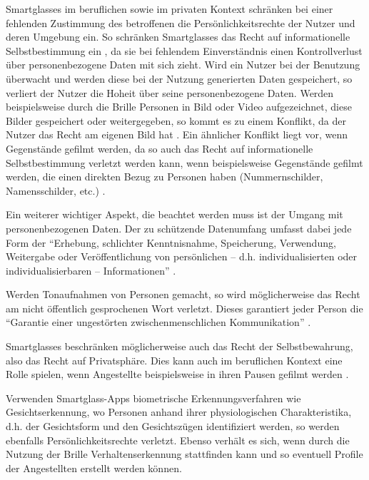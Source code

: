 Smartglasses im beruflichen  sowie im privaten Kontext schränken bei einer fehlenden Zustimmung des betroffenen die Persönlichkeitsrechte der Nutzer und deren Umgebung ein. So schränken Smartglasses das Recht auf informationelle Selbstbestimmung ein \cite[S.~100]{Schwenke2016}, da sie bei fehlendem Einverständnis einen Kontrollverlust über personenbezogene Daten mit sich zieht. Wird ein Nutzer bei der Benutzung überwacht und werden diese bei der Nutzung generierten Daten gespeichert, so verliert der Nutzer die Hoheit über seine personenbezogene Daten. Werden beispielsweise durch die Brille Personen in Bild oder Video aufgezeichnet, diese Bilder gespeichert oder weitergegeben, so kommt es zu einem Konflikt, da der Nutzer das Recht am eigenen Bild hat \cite[S.~104ff]{Schwenke2016} \cite[S.~109f]{Schwenke2016}. 
Ein ähnlicher Konflikt liegt vor, wenn Gegenstände gefilmt werden, da so auch das Recht auf informationelle Selbstbestimmung verletzt werden kann, wenn beispielsweise Gegenstände gefilmt werden, die einen direkten Bezug zu Personen haben (Nummernschilder, Namensschilder, etc.) \cite[S.~106]{Schwenke2016}. 

Ein weiterer wichtiger Aspekt, die beachtet werden muss ist der Umgang mit personenbezogenen Daten. Der zu schützende Datenumfang umfasst dabei jede Form der
\enquote{Erhebung, schlichter Kenntnisnahme, Speicherung, Verwendung, Weitergabe oder Veröffentlichung von persönlichen – d.h. individualisierten oder individualisierbaren – Informationen} \cite[S.~108]{Schwenke2016}.

Werden Tonaufnahmen von Personen gemacht, so wird möglicherweise das Recht am nicht öffentlich gesprochenen Wort verletzt. Dieses garantiert jeder Person die \enquote{Garantie einer ungestörten zwischenmenschlichen Kommunikation} \cite[S.~112]{Schwenke2016}.

Smartglasses beschränken möglicherweise auch das Recht der Selbstbewahrung, also das Recht auf Privatsphäre. Dies kann auch im beruflichen Kontext eine Rolle spielen, wenn Angestellte beispielsweise in ihren Pausen gefilmt werden \cite[S.~114f]{Schwenke2016}.

Verwenden Smartglass-Apps biometrische Erkennungsverfahren wie Gesichtserkennung, wo Personen anhand ihrer physiologischen Charakteristika, d.h. der Gesichtsform und den Gesichtszügen identifiziert werden, so werden ebenfalls Persönlichkeitsrechte verletzt. Ebenso verhält es sich, wenn durch die Nutzung der Brille Verhaltenserkennung stattfinden kann und so eventuell Profile der Angestellten erstellt werden können.

